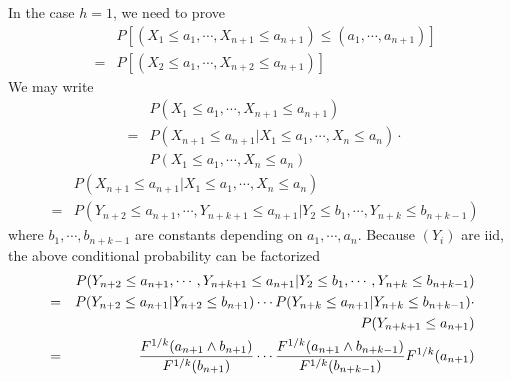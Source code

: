 \documentclass{report}
\begin{document}
\begin{enumerate}[1.]
\begin{enumerate}[(a)]
    In the case $h=1$, we need to prove
    \begin{eqnarray*}
      && P\left[(X_1 \le a_1, \cdots, X_{n+1} \le a_{n+1}) \le (a_1,
        \cdots, a_{n+1}) \right] \\
      &=& P\left[(X_2 \le a_1, \cdots, X_{n+2} \le a_{n+1}) \right]
    \end{eqnarray*}
    We may write
    \begin{eqnarray*}
      && P(X_1 \le a_1, \cdots, X_{n+1} \le a_{n+1}) \\
      &=& P(X_{n+1} \le a_{n+1} | X_1 \le a_1, \cdots, X_{n} \le
      a_{n}) \cdot \\
      && P(X_1 \le a_1, \cdots, X_{n} \le a_{n})
    \end{eqnarray*}
    \begin{eqnarray*}
      && P(X_{n+1} \le a_{n+1} | X_1 \le a_1, \cdots, X_{n} \le
      a_{n}) \\
      &=& P(Y_{n+2} \le a_{n+1}, \cdots, Y_{n+k+1} \le a_{n+1} | Y_2
      \le b_1, \cdots, Y_{n+k} \le b_{n+k-1})
    \end{eqnarray*}
    where $b_1, \cdots, b_{n+k-1}$ are constants depending on $a_1,
    \cdots, a_n$. Because $(Y_i)$ are iid, the above conditional
    probability can be factorized
    \begin{eqnarray*}
      && P(Y_{n+2} \le a_{n+1}, \cdots, Y_{n+k+1} \le a_{n+1} | Y_2
      \le b_1, \cdots, Y_{n+k} \le b_{n+k-1}) \\
      &=& P(Y_{n+2} \le a_{n+1} | Y_{n+2} \le b_{n+1}) \cdots
      P(Y_{n+k} \le a_{n+1} | Y_{n+k} \le b_{n+k-1}) \cdot \\
      && P(Y_{n+k+1} \le a_{n+1}) \\
      &=& {F^{1/k}(a_{n+1} \wedge b_{n+1}) \over F^{1/k}(b_{n+1})} \cdots
      {F^{1/k}(a_{n+1} \wedge b_{n+k-1}) \over F^{1/k}(b_{n+k-1})}
      F^{1/k}(a_{n+1})
    \end{eqnarray*}
    

\end{enumerate}
\end{enumerate}
\end{document}
